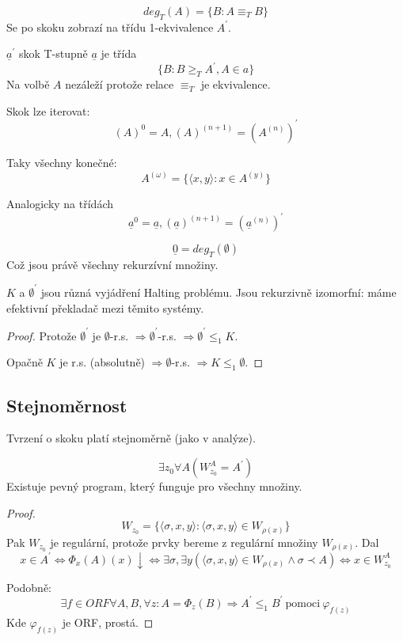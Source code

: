 \begin{note}
	\[ deg_T(A) = \{ B: A \equiv_T B \} \]
	Se po skoku zobrazí na třídu 1-ekvivalence $A^{\prime}$.

\end{note}

\begin{definition}\label{jump_T}
	$\underline{a}^{\prime}$ skok T-stupně $\underline{a}$ je třída
	\[ \{ B: B \geq_T A^{\prime}, A \in a \} \]
	Na volbě $A$ nezáleží protože relace $\equiv_T$ je ekvivalence.
\end{definition}

\begin{note}
	Skok lze iterovat:
	\[ (A)^0 = A, (A)^{(n + 1)} = (A^{(n)})^{\prime} \]

	Taky všechny konečné:
	\[ A^{(\omega)} = \{ \langle x, y \rangle: x \in A^{(y)} \} \]

	Analogicky na třídách
	\[ \underline{a}^0 = \underline{a}, (\underline{a})^{(n + 1)} = (\underline{a}^{(n)})^{\prime} \]
\end{note}

\begin{observation}
	\[ \underline{0} = deg_T(\emptyset) \]
	Což jsou právě všechny rekurzívní množiny.
\end{observation}

\begin{observation}
	$K$ a $\emptyset^{\prime}$ jsou různá vyjádření Halting problému.
	Jsou rekurzivně izomorfní: máme efektivní překladač mezi těmito systémy.
\end{observation}
\begin{proof}
	Protože $\emptyset^{\prime}$ je $\emptyset$-r.s. $\Rightarrow \emptyset^{\prime}$-r.s. $\Rightarrow \emptyset^{\prime}  \leq_1 K $.

	Opačně $K$ je r.s. (absolutně) $\Rightarrow \emptyset$-r.s. $\Rightarrow K \leq_1 \emptyset$.
\end{proof}

\subsection{Stejnoměrnost}
Tvrzení o skoku platí stejnoměrně (jako v analýze).

\begin{theorem}
	\[ \exists z_0 \forall A (W_{z_0}^A = A^{\prime}) \]
	Existuje pevný program, který funguje pro všechny množiny.
\end{theorem}
\begin{proof}
	\[ W_{z_0} = \{ \langle \sigma, x, y \rangle: \langle \sigma, x, y \rangle \in W_{\rho(x)} \} \]
	Pak $W_{z_0}$ je regulární, protože prvky bereme z regulární množiny $W_{\rho(x)}$.
	Dal
	\[ x \in A^{\prime} \iff \Phi_x(A)(x) \downarrow \iff \exists \sigma, \exists y(\langle \sigma, x, y \rangle \in W_{\rho(x)} \land \sigma \prec A) \iff x \in W_{z_0}^A \]

	Podobně: \[ \exists f \in ORF \forall A, B, \forall z: A = \Phi_z(B) \Rightarrow A^{\prime} \leq_1 B^{\prime}\ \text{pomoci}\ \varphi_{f(z)} \]
	Kde $\varphi_{f(z)}$ je ORF, prostá.
\end{proof}
